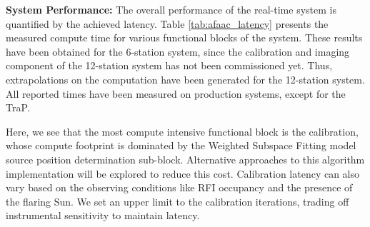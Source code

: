 \documentclass{ws-jai}
\begin{document}



\noindent \textbf {System Performance:} The overall performance of the real-time
system  is quantified  by  the achieved  latency. Table  \ref{tab:afaac_latency}
presents  the  measured  compute  time  for various  functional  blocks  of  the
system. These  results have been  obtained for  the 6-station system,  since the
calibration  and  imaging  component  of  the 12-station  system  has  not  been
commissioned yet.  Thus, extrapolations on  the computation have  been generated
for the 12-station  system. All reported times have been  measured on production
systems, except for the TraP.

Here,  we  see  that  the  most   compute  intensive  functional  block  is  the
calibration,  whose compute  footprint  is dominated  by  the Weighted  Subspace
Fitting model source position determination sub-block. Alternative approaches to
this algorithm implementation will be  explored to reduce this cost. Calibration
latency can also  vary based on the observing conditions  like RFI occupancy and
the  presence of  the flaring  Sun. We  set an  upper limit  to the  calibration
iterations, trading off instrumental sensitivity to maintain latency.
\end{document}
